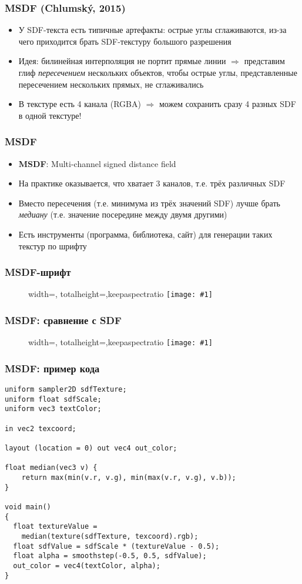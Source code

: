 \documentclass{beamer}
\newcommand{\slideimage}[1]{
  \begin{figure}
    \begin{adjustbox}{width=\textwidth, totalheight=\textheight-2\baselineskip-2\baselineskip,keepaspectratio}
      \texttt{[image: \#1]}
    \end{adjustbox}
  \end{figure}
}
\begin{document}
\begin{frame}[fragile]
\frametitle{MSDF (Chlumský, 2015)}
\begin{itemize}
\item У SDF-текста есть типичные артефакты: острые углы сглаживаются, из-за чего приходится брать SDF-текстуру большого разрешения
\pause
\item Идея: билинейная интерполяция не портит прямые линии \begin{math}\Longrightarrow\end{math} представим глиф \textit{пересечением} нескольких объектов, чтобы острые углы, представленные пересечением нескольких прямых, не сглаживались
\pause
\item В текстуре есть 4 канала (RGBA) \begin{math}\Longrightarrow\end{math} можем сохранить сразу 4 разных SDF в одной текстуре!
\end{itemize}
\end{frame}

\begin{frame}[fragile]
\frametitle{MSDF}
\begin{itemize}
\item \textbf{MSDF}: Multi-channel signed distance field
\pause
\item На практике оказывается, что хватает 3 каналов, т.е. трёх различных SDF
\pause
\item Вместо пересечения (т.е. минимума из трёх значений SDF) лучше брать \textit{медиану} (т.е. значение посередине между двумя другими)
\pause
\item Есть инструменты (программа, библиотека, сайт) для генерации таких текстур по шрифту
\end{itemize}
\end{frame}

\begin{frame}[fragile]
\frametitle{MSDF-шрифт}
\slideimage{msdf-font.png}
\end{frame}

\begin{frame}[fragile]
\frametitle{MSDF: сравнение с SDF}
\slideimage{msdf.png}
\end{frame}

\begin{frame}[fragile]
\frametitle{MSDF: пример кода}
\begin{verbatim}
uniform sampler2D sdfTexture;
uniform float sdfScale;
uniform vec3 textColor;

in vec2 texcoord;

layout (location = 0) out vec4 out_color;

float median(vec3 v) {
    return max(min(v.r, v.g), min(max(v.r, v.g), v.b));
}

void main()
{
  float textureValue =
    median(texture(sdfTexture, texcoord).rgb);
  float sdfValue = sdfScale * (textureValue - 0.5);
  float alpha = smoothstep(-0.5, 0.5, sdfValue);
  out_color = vec4(textColor, alpha);
}
\end{verbatim}
\end{frame}
\end{document}
